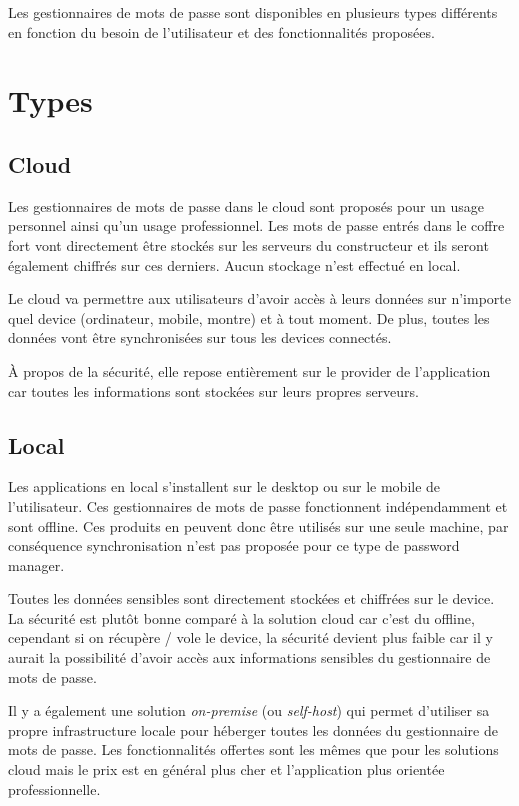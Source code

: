 Les gestionnaires de mots de passe sont disponibles en plusieurs types différents en fonction du besoin de l'utilisateur et des fonctionnalités proposées. 

\section{Types}

\subsection{Cloud}
Les gestionnaires de mots de passe dans le cloud sont proposés pour un usage personnel ainsi qu'un usage professionnel. Les mots de passe entrés dans le coffre fort vont directement être stockés sur les serveurs du constructeur et ils seront également chiffrés sur ces derniers. Aucun stockage n'est effectué en local.

Le cloud va permettre aux utilisateurs d'avoir accès à leurs données sur n'importe quel device (ordinateur, mobile, montre) et à tout moment. De plus, toutes les données vont être synchronisées sur tous les devices connectés.

À propos de la sécurité, elle repose entièrement sur le provider de l'application car toutes les informations sont stockées sur leurs propres serveurs.

\subsection{Local}
Les applications en local s'installent sur le desktop ou sur le mobile de l'utilisateur. Ces gestionnaires de mots de passe fonctionnent indépendamment et sont offline. Ces produits en peuvent donc être utilisés sur une seule machine, par conséquence synchronisation  n'est pas proposée pour ce type de password manager. 

Toutes les données sensibles sont directement stockées et chiffrées sur le device. La sécurité est plutôt bonne comparé à la solution cloud car c'est du offline, cependant si on récupère / vole le device, la sécurité devient plus faible car il y aurait la possibilité d'avoir accès aux informations sensibles du gestionnaire de mots de passe. 

Il y a également une solution \textit{on-premise} (ou \textit{self-host}) qui permet d'utiliser sa propre infrastructure locale pour héberger toutes les données du gestionnaire de mots de passe. Les fonctionnalités offertes sont les mêmes que pour les solutions cloud mais le prix est en général plus cher et l'application plus orientée professionnelle.

